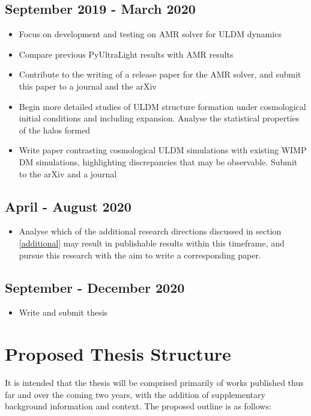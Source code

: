 \subsection*{September 2019 - March 2020}
\begin{itemize}
    \item Focus on development and testing on AMR solver for ULDM dynamics
    \item Compare previous PyUltraLight results with AMR results
    \item Contribute to the writing of a release paper for the AMR solver, and submit this paper to a journal and the arXiv
    \item Begin more detailed studies of ULDM structure formation under cosmological initial conditions and including expansion. Analyse the statistical properties of the halos formed
    \item Write paper contrasting cosmological ULDM simulations with existing WIMP DM simulations, highlighting discrepancies that may be observable. Submit to the arXiv and a journal
\end{itemize}

\subsection*{April - August 2020}
\begin{itemize}
    \item Analyse which of the additional research directions discussed in section \ref{additional} may result in publishable results within this timeframe, and pursue this research with the aim to write a corresponding paper.
\end{itemize}

\subsection*{September - December 2020}
\begin{itemize}
    \item Write and submit thesis
\end{itemize}



\section{Proposed Thesis Structure}

It is intended that the thesis will be comprised primarily of works published thus far and over the coming two years, with the addition of supplementary background information and context. The proposed outline is as follows:

